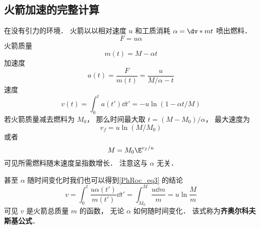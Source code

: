 \subsection{火箭加速的完整计算}
在没有引力的环境． 火箭以以相对速度 $u$ 和工质消耗 $\alpha = \dv*{m}{t}$  喷出燃料．
\begin{equation}
F = u\alpha
\end{equation}
火箭质量
\begin{equation}
m(t) = M - \alpha t
\end{equation}
加速度
\begin{equation}
a(t) = \frac{F}{m(t)} = \frac{u}{M/\alpha - t}
\end{equation}
速度
\begin{equation}
v(t) = \int_0^t a(t') \dd{t'} = -u \ln(1 - \alpha t / M)
\end{equation}
若火箭质量减去燃料为 $M_0$， 那么时间最大取 $t = (M - M_0)/\alpha$， 最大速度为
\begin{equation}
v_f = u \ln(M / M_0)
\end{equation}
或者
\begin{equation}\label{PhRoc_eq3}
M = M_0\E^{v_f/u}
\end{equation}
可见所需燃料随末速度呈指数增长． 注意这与 $\alpha$ 无关．

甚至 $\alpha$ 随时间变化时我们也可以得到\autoref{PhRoc_eq3} 的结论
\begin{equation}
v = \int_0^t \frac{u\alpha(t')}{m(t')}\dd{t'} = \int_{M_0}^M \frac{u\dd{m}}{m} = u\ln{\frac{M}{m}}
\end{equation}
可见 $v$ 是火箭总质量 $m$ 的函数， 无论 $\alpha$ 如何随时间变化． 该式称为\textbf{齐奥尔科夫斯基公式}．

